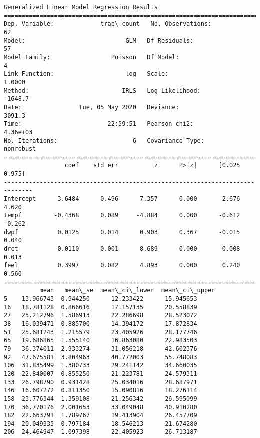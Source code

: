 \documentclass[11pt]{article}
\begin{document}
    \begin{Verbatim}[commandchars=\\\{\}]
                 Generalized Linear Model Regression Results                  
==============================================================================
Dep. Variable:             trap\_count   No. Observations:                   62
Model:                            GLM   Df Residuals:                       57
Model Family:                 Poisson   Df Model:                            4
Link Function:                    log   Scale:                          1.0000
Method:                          IRLS   Log-Likelihood:                -1648.7
Date:                Tue, 05 May 2020   Deviance:                       3091.3
Time:                        22:59:51   Pearson chi2:                 4.36e+03
No. Iterations:                     6   Covariance Type:             nonrobust
==============================================================================
                 coef    std err          z      P>|z|      [0.025      0.975]
------------------------------------------------------------------------------
Intercept      3.6484      0.496      7.357      0.000       2.676       4.620
tempf         -0.4368      0.089     -4.884      0.000      -0.612      -0.262
dwpf           0.0125      0.014      0.903      0.367      -0.015       0.040
drct           0.0110      0.001      8.689      0.000       0.008       0.013
feel           0.3997      0.082      4.893      0.000       0.240       0.560
==============================================================================
          mean   mean\_se  mean\_ci\_lower  mean\_ci\_upper
5    13.966743  0.944250      12.233422      15.945653
16   18.781128  0.866616      17.157135      20.558839
27   25.212796  1.586913      22.286698      28.523072
38   16.039471  0.885700      14.394172      17.872834
51   25.681243  1.215579      23.405926      28.177746
65   19.686865  1.555140      16.863080      22.983503
79   36.374011  2.933274      31.056218      42.602376
92   47.675581  3.804963      40.772003      55.748083
106  31.835499  1.380733      29.241142      34.660035
120  22.840007  0.855250      21.223781      24.579311
133  26.798790  0.931428      25.034016      28.687971
146  16.607272  0.811350      15.090816      18.276114
158  23.776344  1.359108      21.256342      26.595099
170  36.770176  2.001653      33.049048      40.910280
182  22.663791  1.789767      19.413904      26.457709
194  20.049335  0.797184      18.546213      21.674280
206  24.464947  1.097398      22.405923      26.713187

\end{Verbatim}
\end{document}
